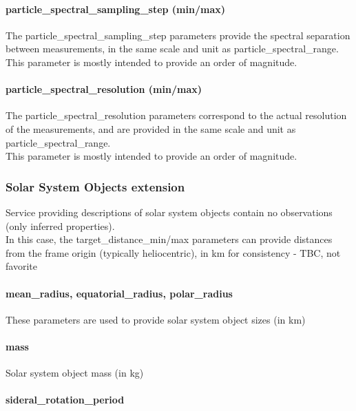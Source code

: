 \documentclass[11pt,a4paper]{ivoa}
\begin{document}
\paragraph{particle\_spectral\_sampling\_step (min/max)}

The particle\_spectral\_sampling\_step parameters provide the spectral separation between measurements, in the same scale and unit as particle\_spectral\_range.\\This parameter is mostly intended to provide an order of magnitude.

\paragraph{particle\_spectral\_resolution (min/max)}

The particle\_spectral\_resolution parameters correspond to the actual resolution of the measurements, and are provided in the same scale and unit as particle\_spectral\_range. \\This parameter is mostly intended to provide an order of magnitude.

\subsubsection{Solar System Objects extension}

Service providing descriptions of solar system objects contain no observations (only inferred properties).\\In this case, the target\_distance\_min/max parameters can provide distances from the frame origin (typically heliocentric), in km for consistency - TBC, not favorite

\paragraph{mean\_radius, equatorial\_radius, polar\_radius}

These parameters are used to provide solar system object sizes (in km)

\paragraph{mass}

Solar system object mass (in kg)

\paragraph{sideral\_rotation\_period}
\end{document}
